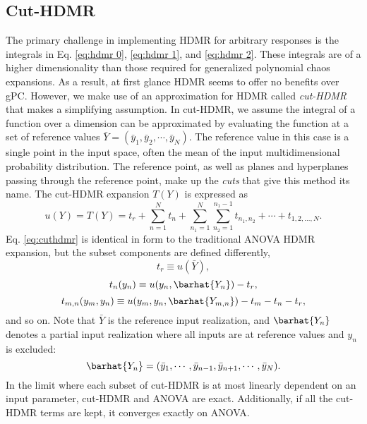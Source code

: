 \subsection{Cut-HDMR}\label{sec:cuthdmr}
The primary challenge in implementing HDMR for arbitrary responses is the integrals in Eq. \ref{eq:hdmr 0},
\ref{eq:hdmr 1}, and \ref{eq:hdmr 2}.  These integrals are of a higher dimensionality than those required for
generalized polynomial chaos expansions.  As a result, at first glance HDMR seems to offer no benefits over gPC.  However,
we make use of an approximation for HDMR called \emph{cut-HDMR} \cite{cutHDMR} that makes a simplifying assumption.
In cut-HDMR, we assume the integral of a function over a dimension can be approximated by evaluating the
function at a set of reference values $\bar Y = (\bar y_1,\bar y_2,\cdots,\bar y_N)$.  The reference value in this case
is a single point in the input space, often the mean of the input multidimensional probability distribution.  The
reference point, as well as planes and hyperplanes passing through the reference point, make up the
\emph{cuts} that give this method its name.  The cut-HDMR expansion $T(Y)$ is expressed as
\begin{equation}\label{eq:cuthdmr}
  u(Y) = T(Y) = t_r + \sum_{n=1}^N t_n + \sum_{n_1=1}^N \sum_{n_2=1}^{n_1-1}
  t_{n_1,n_2}+\cdots+t_{1,2,\ldots,N}.
\end{equation}
Eq. \ref{eq:cuthdmr} is identical in form to the traditional ANOVA HDMR expansion, but the subset components
are defined differently,
\begin{equation}
  t_r \equiv u(\bar Y),
\end{equation}
\begin{equation}
  t_n(y_n) \equiv u(y_n,\barhat{Y_n}) - t_r,
\end{equation}
\begin{equation}
  t_{m,n}(y_m,y_n) \equiv u(y_m,y_n,\barhat{Y_{m,n}}) - t_m - t_n - t_r,
\end{equation}
and so on. Note that $\bar Y$ is the reference input realization, and 
$\barhat{Y_n}$ denotes a partial input realization where all inputs are at reference values and $y_n$ is
excluded:
\begin{equation}
  \barhat{Y_n} = (\bar y_1,\cdots,\bar y_{n-1},\bar y_{n+1},\cdots,\bar y_N).
\end{equation}
In the limit where each subset of cut-HDMR is at most linearly dependent on an input parameter, cut-HDMR and
ANOVA are exact.  Additionally, if all the cut-HDMR terms are kept, it converges exactly on ANOVA.

